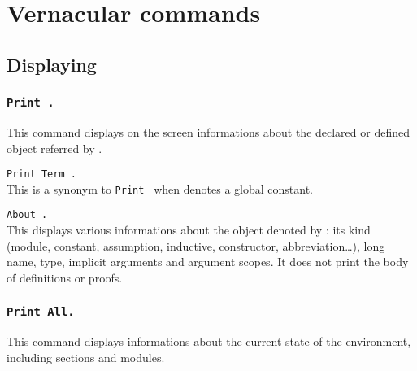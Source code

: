 \chapter[Vernacular commands]{Vernacular commands\label{Vernacular-commands}
\label{Other-commands}}

\section{Displaying}

\subsection[\tt Print {\qualid}.]{\tt Print {\qualid}.}
This command displays on the screen informations about the declared or
defined object referred by {\qualid}.

\begin{ErrMsgs}
\item {\qualid} 
\end{ErrMsgs}

\begin{Variants}
\item {\tt Print Term {\qualid}.}
\\ 
This is a synonym to {\tt Print {\qualid}} when {\qualid} denotes a
global constant. 

\item {\tt About {\qualid}.}
\label{About}
\\ 
This displays various informations about the object denoted by {\qualid}:
its kind (module, constant, assumption, inductive,
constructor, abbreviation\ldots), long name, type, implicit
arguments and argument scopes. It does not print the body of
definitions or proofs.

\end{Variants}

\subsection[\tt Print All.]{\tt Print All.}
This command displays informations about the current state of the
environment, including sections and modules.

